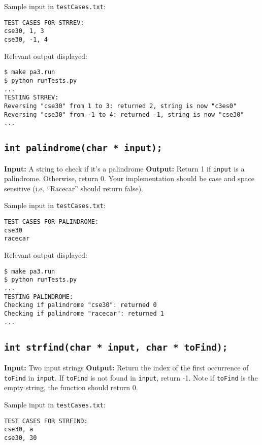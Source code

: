 \documentclass{article}
\begin{document}
\noindent Sample input in {\tt testCases.txt}:
\begin{verbatim}
TEST CASES FOR STRREV:
cse30, 1, 3
cse30, -1, 4
\end{verbatim}

\noindent  Relevant output displayed:
\begin{verbatim}
$ make pa3.run
$ python runTests.py 
...
TESTING STRREV:
Reversing "cse30" from 1 to 3: returned 2, string is now "c3es0"
Reversing "cse30" from -1 to 4: returned -1, string is now "cse30"
...
\end{verbatim}

\subsection{{\tt int palindrome(char * input);}}
\textbf{Input:} A string to check if it's a palindrome \newline
\textbf{Output:} Return 1 if {\tt input} is a palindrome. Otherwise, return 0. Your implementation should be case and space sensitive (i.e. ``Racecar'' should return false). \newline

\noindent Sample input in {\tt testCases.txt}:
\begin{verbatim}
TEST CASES FOR PALINDROME:
cse30
racecar
\end{verbatim}

\noindent  Relevant output displayed:
\begin{verbatim}
$ make pa3.run
$ python runTests.py 
...
TESTING PALINDROME:
Checking if palindrome "cse30": returned 0
Checking if palindrome "racecar": returned 1
...
\end{verbatim}

\subsection{{\tt int strfind(char * input, char * toFind);}}
\textbf{Input:} Two input strings \newline
\textbf{Output:} Return the index of the first occurrence of {\tt toFind} in {\tt input}. If {\tt toFind} is not found in {\tt input}, return -1. Note if {\tt toFind} is the empty string, the function should return 0. \newline

\noindent Sample input in {\tt testCases.txt}:
\begin{verbatim}
TEST CASES FOR STRFIND:
cse30, a
cse30, 30
\end{verbatim}
\end{document}
